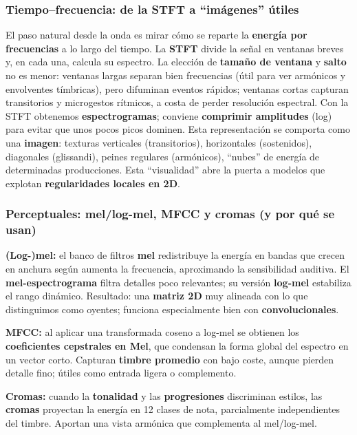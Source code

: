 \documentclass[12pt,twoside]{article}
\begin{document}
\subsubsection{Tiempo--frecuencia: de la STFT a ``imágenes'' útiles}

El paso natural desde la onda es mirar cómo se reparte la \textbf{energía por frecuencias} a lo largo del tiempo. La \textbf{STFT} divide la señal en ventanas breves y, en cada una, calcula su espectro. La elección de \textbf{tamaño de ventana} y \textbf{salto} no es menor: ventanas largas separan bien frecuencias (útil para ver armónicos y envolventes tímbricas), pero difuminan eventos rápidos; ventanas cortas capturan transitorios y microgestos rítmicos, a costa de perder resolución espectral. Con la STFT obtenemos \textbf{espectrogramas}; conviene \textbf{comprimir amplitudes} (log) para evitar que unos pocos picos dominen. Esta representación se comporta como una \textbf{imagen}: texturas verticales (transitorios), horizontales (sostenidos), diagonales (glissandi), peines regulares (armónicos), ``nubes'' de energía de determinadas producciones. Esta ``visualidad'' abre la puerta a modelos que explotan \textbf{regularidades locales en 2D}.

\subsubsection{Perceptuales: mel/log-mel, MFCC y cromas (y por qué se usan)}

\textbf{(Log-)mel:} el banco de filtros \textbf{mel} redistribuye la energía en bandas que crecen en anchura según aumenta la frecuencia, aproximando la sensibilidad auditiva. El \textbf{mel-espectrograma} filtra detalles poco relevantes; su versión \textbf{log-mel} estabiliza el rango dinámico. Resultado: una \textbf{matriz 2D} muy alineada con lo que distinguimos como oyentes; funciona especialmente bien con \textbf{convolucionales}.

\textbf{MFCC:} al aplicar una transformada coseno a log-mel se obtienen los \textbf{coeficientes cepstrales en Mel}, que condensan la forma global del espectro en un vector corto. Capturan \textbf{timbre promedio} con bajo coste, aunque pierden detalle fino; útiles como entrada ligera o complemento.

\textbf{Cromas:} cuando la \textbf{tonalidad} y las \textbf{progresiones} discriminan estilos, las \textbf{cromas} proyectan la energía en 12 clases de nota, parcialmente independientes del timbre. Aportan una vista armónica que complementa al mel/log-mel.
\end{document}
